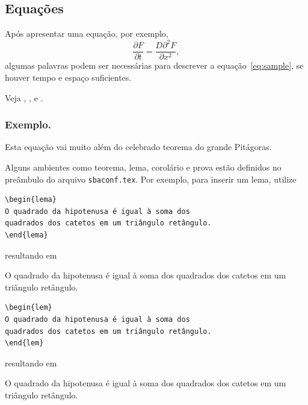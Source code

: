 \subsection{Equações}



Após apresentar uma equação, por exemplo, 
\begin{equation} \label{eq:sample}
\frac{\partial F}{\partial t} = \frac{D \partial^2 F}{\partial x^2}, 
\end{equation}
algumas palavras podem ser necessárias para descrever a equação~\eqref{eq:sample},
se houver tempo e espaço suficientes. 


Veja \cite{Abl:56}, \cite{AbTaRu:54}, \cite{Keo:58} e \cite{Pow:85}. 

\subsubsection{Exemplo.} 

Esta equação vai muito além do celebrado teorema do grande Pitágoras.

Alguns ambientes como teorema, lema, corolário e prova estão definidos no preâmbulo 
do arquivo {\tt sbaconf.tex}. Por exemplo, para inserir um lema, utilize
\if{}
\begin{verbatim}
\begin{lema}
O quadrado da hipotenusa é igual à soma dos 
quadrados dos catetos em um triângulo retângulo.
\end{lema}
\end{verbatim}
resultando em
\begin{lema}   %
	O quadrado da hipotenusa é igual à soma dos quadrados dos catetos em um triângulo retângulo. 
\end{lema}
\else
\begin{verbatim}
\begin{lem}
O quadrado da hipotenusa é igual à soma dos 
quadrados dos catetos em um triângulo retângulo.
\end{lem}
\end{verbatim}
resultando em
\begin{lem}   %
	O quadrado da hipotenusa é igual à soma dos quadrados dos catetos em um triângulo retângulo. 
\end{lem}
\fi

